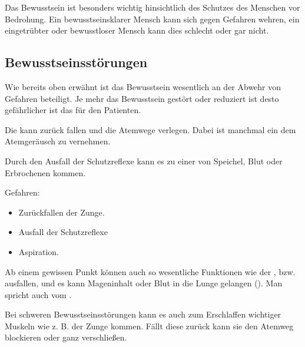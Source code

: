 Das Bewusstsein ist besonders wichtig hinsichtlich des Schutzes des
Menschen vor Bedrohung. Ein bewusstseinsklarer Mensch kann sich gegen
Gefahren wehren, ein eingetrübter oder bewusstloser Mensch kann dies
schlecht oder gar nicht. 

\subsection{Bewusstseinsstörungen}
\label{topic:bewusstseinsstoerung}



{%
Wie bereits oben erwähnt ist das Bewusstsein wesentlich an der Abwehr
von Gefahren beteiligt. Je mehr das Bewusstsein gestört oder
reduziert ist desto gefährlicher ist das für den Patienten. 

Die  kann zurück fallen und die Atemwege
verlegen. Dabei ist manchmal ein dem
 Atemgeräusch zu
vernehmen. 

Durch den Ausfall  der
Schutzreflexe kann es zu einer
 von Speichel, Blut oder Erbrochenen kommen. 
}{%
Gefahren:
\begin{itemize}
  \item Zurückfallen der Zunge.
  \item Ausfall der Schutzreflexe
  \item Aspiration.
\end{itemize}
}{}{}{}

{%
Ab einem gewissen Punkt können auch so wesentliche
Funktionen wie der ,  bzw. 
ausfallen, und es kann Mageninhalt oder Blut in die
Lunge gelangen (). Man spricht auch vom
.

Bei schweren Bewusstseinsstörungen kann es auch zum Erschlaffen
wichtiger Muskeln wie z. B. der Zunge kommen. Fällt
diese zurück kann sie den Atemweg blockieren oder ganz verschließen.
}{}{}{}{}




